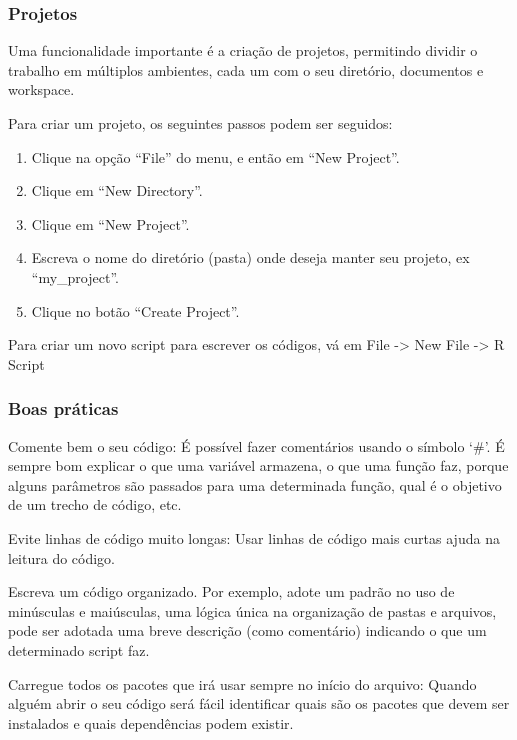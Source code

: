 \documentclass[
]{book}
\begin{document}
\hypertarget{projetos}{%
\subsubsection{Projetos}\label{projetos}}

Uma funcionalidade importante é a criação de projetos, permitindo dividir o trabalho em múltiplos ambientes, cada um com o seu diretório, documentos e workspace.

Para criar um projeto, os seguintes passos podem ser seguidos:

\begin{enumerate}
\def\labelenumi{\arabic{enumi})}
\item
  Clique na opção ``File'' do menu, e então em ``New Project''.
\item
  Clique em ``New Directory''.
\item
  Clique em ``New Project''.
\item
  Escreva o nome do diretório (pasta) onde deseja manter seu projeto, ex ``my\_project''.
\item
  Clique no botão ``Create Project''.
\end{enumerate}

Para criar um novo script para escrever os códigos, vá em File -\textgreater{} New File -\textgreater{} R Script

\hypertarget{boas-pruxe1ticas}{%
\subsubsection{Boas práticas}\label{boas-pruxe1ticas}}

Comente bem o seu código: É possível fazer comentários usando o símbolo `\#'. É sempre bom explicar o que uma variável armazena, o que uma função faz, porque alguns parâmetros são passados para uma determinada função, qual é o objetivo de um trecho de código, etc.

Evite linhas de código muito longas: Usar linhas de código mais curtas ajuda na leitura do código.

Escreva um código organizado. Por exemplo, adote um padrão no uso de minúsculas e maiúsculas, uma lógica única na organização de pastas e arquivos, pode ser adotada uma breve descrição (como comentário) indicando o que um determinado script faz.

Carregue todos os pacotes que irá usar sempre no início do arquivo: Quando alguém abrir o seu código será fácil identificar quais são os pacotes que devem ser instalados e quais dependências podem existir.
\end{document}
